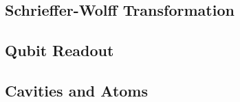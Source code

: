 \subsection{Schrieffer-Wolff Transformation}


\setcounter{subsection}{2}
\subsection{Qubit Readout}



\setcounter{subsection}{3}
\subsection{Cavities and Atoms}




% 
% 



% 








